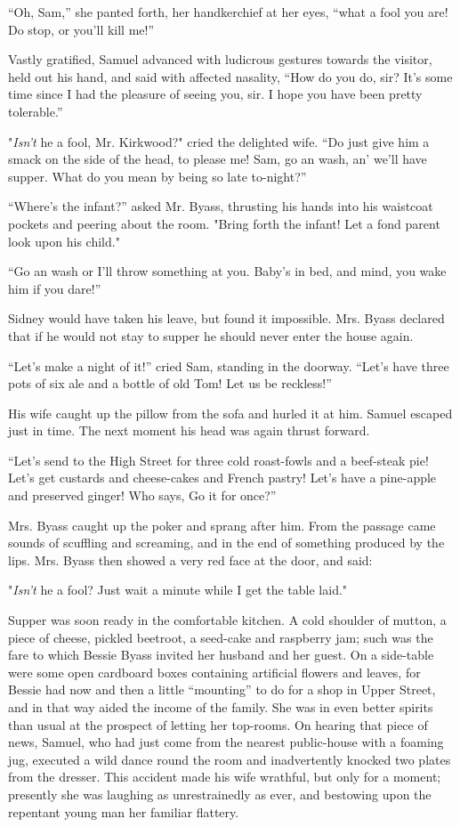 ``Oh, Sam,'' she panted forth, her handkerchief at her eyes, ``what a
fool you are! Do stop, or you'll kill me!''

Vastly gratified, Samuel advanced with ludicrous gestures towards the
visitor, held out his hand, and said with affected nasality, ``How do
you do, sir? It's some time since I had the pleasure of seeing you, sir.
I hope you have been pretty tolerable.''

"\emph{Isn't} he a fool, Mr. Kirkwood?" cried the delighted wife. ``Do
just give him a smack on the side of the head, to please me! Sam, go an
wash, an' we'll have supper. What do you mean by being so late
to-night?''

``Where's the infant?'' asked Mr. Byass, thrusting his hands into his
waistcoat pockets and peering about the room. "Bring forth
{\protect\hypertarget{162}{}{}}the infant! Let a fond parent look upon
his child."

``Go an wash or I'll throw something at you. Baby's in bed, and mind,
you wake him if you dare!''

Sidney would have taken his leave, but found it impossible. Mrs. Byass
declared that if he would not stay to supper he should never enter the
house again.

``Let's make a night of it!'' cried Sam, standing in the doorway.
``Let's have three pots of six ale and a bottle of old Tom! Let us be
reckless!''

His wife caught up the pillow from the sofa and hurled it at him. Samuel
escaped just in time. The next moment his head was again thrust forward.

``Let's send to the High Street for three cold roast-fowls and a
beef-steak pie! Let's get custards and cheese-cakes and French pastry!
Let's have a pine-apple and preserved ginger! Who says, Go it for
once?''

Mrs. Byass caught up the poker and sprang
{\protect\hypertarget{163}{}{}}after him. From the passage came sounds
of scuffling and screaming, and in the end of something produced by the
lips. Mrs. Byass then showed a very red face at the door, and said:

"\emph{Isn't} he a fool? Just wait a minute while I get the table laid."

Supper was soon ready in the comfortable kitchen. A cold shoulder of
mutton, a piece of cheese, pickled beetroot, a seed-cake and raspberry
jam; such was the fare to which Bessie Byass invited her husband and her
guest. On a side-table were some open cardboard boxes containing
artificial flowers and leaves, for Bessie had now and then a little
``mounting'' to do for a shop in Upper Street, and in that way aided the
income of the family. She was in even better spirits than usual at the
prospect of letting her top-rooms. On hearing that piece of news,
Samuel, who had just come from the nearest public-house with a foaming
jug, executed a wild dance round the room and inadvertently knocked two
plates from the dresser. This accident made
{\protect\hypertarget{164}{}{}}his wife wrathful, but only for a moment;
presently she was laughing as unrestrainedly as ever, and bestowing upon
the repentant young man her familiar flattery.

